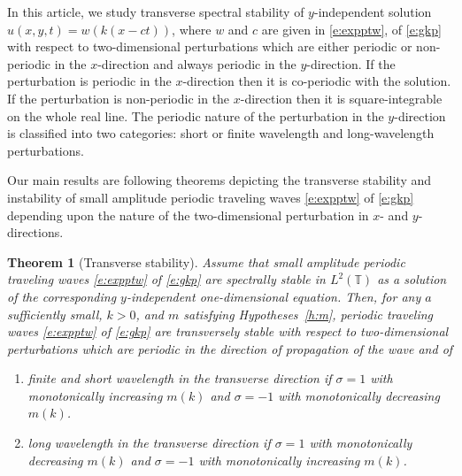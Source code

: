 \documentclass[12pt]{amsart}    %
\newcommand{\oneu}{(1,\uparrow)}
\newcommand{\mind}{(-1,\downarrow)}
\newtheorem{theorem}{Theorem}[section]
\numberwithin{equation}{section}
\begin{document}
\bigskip

In this article, we study transverse spectral stability of $y$-independent solution $u(x,y,t)=w(k(x-ct))$, where $w$ and $c$ are given in \eqref{e:expptw}, of \eqref{e:gkp} with respect to two-dimensional perturbations which are either periodic or non-periodic in the $x$-direction and always periodic in the $y$-direction. If the perturbation is periodic in the $x$-direction then it is co-periodic with the solution. If the perturbation is non-periodic in the $x$-direction then it is square-integrable on the whole real line. The periodic nature of the perturbation in the $y$-direction is classified into two categories: short or finite wavelength and long-wavelength perturbations. 

Our main results are following theorems depicting the transverse stability and instability of small amplitude periodic traveling waves \eqref{e:expptw} of \eqref{e:gkp} depending upon the nature of the two-dimensional perturbation in $x$- and $y$-directions.
\begin{theorem}[Transverse stability]\label{t:2}
Assume that small amplitude periodic traveling waves \eqref{e:expptw} of \eqref{e:gkp} are spectrally stable in $L^2(\mathbb T)$ as a solution of the corresponding $y$-independent one-dimensional equation. Then, for any $a$ sufficiently small, $k>0$, and $m$ satisfying Hypotheses~\ref{h:m}, periodic traveling waves \eqref{e:expptw} of \eqref{e:gkp} are transversely stable with respect to two-dimensional perturbations which are periodic in the direction of propagation of the wave and of
\begin{enumerate}
    \item finite and short wavelength in the transverse direction if $\sigma=1$ with monotonically increasing $m(k)$ and $\sigma=-1$ with monotonically decreasing $m(k)$.
    \item long wavelength in the transverse direction if $\sigma=1$ with monotonically decreasing $m(k)$ and $\sigma=-1$ with monotonically increasing $m(k)$.
\end{enumerate}

\end{theorem}
\end{document}
